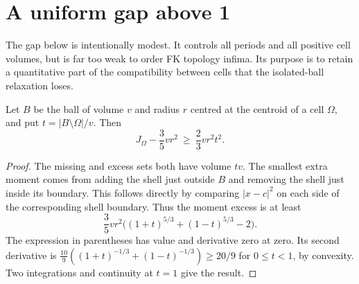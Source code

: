 \documentclass[11pt,a4paper]{report}
\begin{document}
\section{A uniform gap above 1}\label{sec:gap}

The gap below is intentionally modest. It controls all periods and all
positive cell volumes, but is far too weak to order FK topology infima.
Its purpose is to retain a quantitative part of the compatibility between
cells that the isolated-ball relaxation loses.

\begin{lemma}\label{lem:moment-defect}
Let $B$ be the ball of volume $v$ and radius $r$ centred at the centroid of
a cell $\Omega$, and put $t=|B\setminus\Omega|/v$. Then
\[
 J_\Omega-\frac35vr^2\ \geq\ \frac23vr^2t^2.
\]
\end{lemma}
\begin{proof}
The missing and excess sets both have volume $tv$. The smallest extra
moment comes from adding the shell just outside $B$ and removing the
shell just inside its boundary. This follows directly by comparing
$|x-c|^2$ on each side of the corresponding shell boundary. Thus the
moment excess is at least
\[
 \frac35vr^2\bigl((1+t)^{5/3}+(1-t)^{5/3}-2\bigr).
\]
The expression in parentheses has value and derivative zero at zero.
Its second derivative is
$\frac{10}{9}((1+t)^{-1/3}+(1-t)^{-1/3})\geq20/9$ for $0\leq t<1$,
by convexity. Two integrations and continuity at $t=1$ give the result.
\end{proof}
\end{document}
